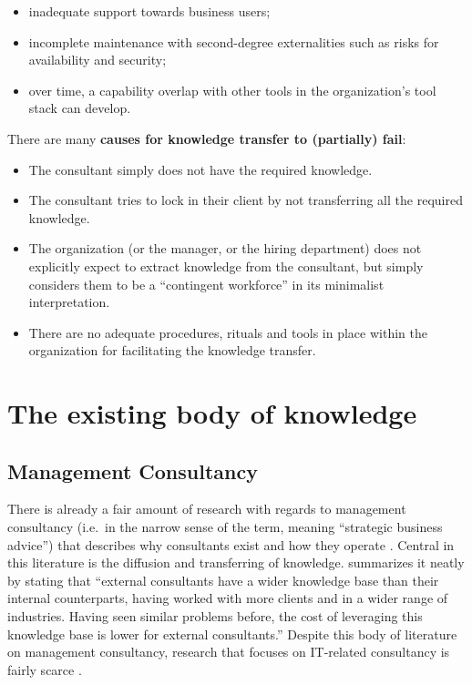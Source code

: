 \documentclass[12pt]{article}
\providecommand{\tightlist}{%
  \setlength{\itemsep}{0pt}\setlength{\parskip}{0pt}}
\begin{document}
\begin{itemize}
\tightlist
\item
  inadequate support towards business users;
\item
  incomplete maintenance with second-degree externalities such as risks
  for availability and security;
\item
  over time, a capability overlap with other tools in the organization's
  tool stack can develop.
\end{itemize}

There are many \textbf{causes for knowledge transfer to (partially)
fail}:

\begin{itemize}
\tightlist
\item
  The consultant simply does not have the required knowledge.
\item
  The consultant tries to lock in their client by not transferring all
  the required knowledge.
\item
  The organization (or the manager, or the hiring department) does not
  explicitly expect to extract knowledge from the consultant, but simply
  considers them to be a ``contingent workforce'' in its minimalist
  interpretation.
\item
  There are no adequate procedures, rituals and tools in place within
  the organization for facilitating the knowledge transfer.
\end{itemize}

\hypertarget{the-existing-body-of-knowledge}{%
\section{The existing body of
knowledge}\label{the-existing-body-of-knowledge}}

\hypertarget{management-consultancy}{%
\subsection{Management Consultancy}\label{management-consultancy}}

There is already a fair amount of research with regards to management
consultancy (i.e.~in the narrow sense of the term, meaning ``strategic
business advice'') that describes why consultants exist
\citep{canback1998, sturdy2009} and how they operate
\citep{clark1998, bessant1995, whittle2006}. Central in this literature
is the diffusion and transferring of knowledge. \citet{canback1999}
summarizes it neatly by stating that ``external consultants have a wider
knowledge base than their internal counterparts, having worked with more
clients and in a wider range of industries. Having seen similar problems
before, the cost of leveraging this knowledge base is lower for external
consultants.'' Despite this body of literature on management
consultancy, research that focuses on IT-related consultancy is fairly
scarce \citep{bloomfield1995, nevo2007, swanson2010}.
\end{document}
